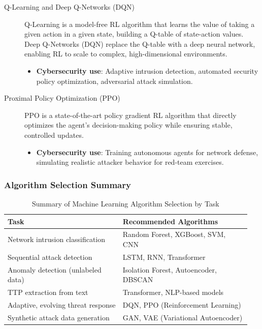 \begin{description}
    \item[Q-Learning and Deep Q-Networks (DQN)] Q-Learning is a model-free RL algorithm that learns the value of taking a given action in a given state, building a Q-table of state-action values. Deep Q-Networks (DQN) replace the Q-table with a deep neural network, enabling RL to scale to complex, high-dimensional environments.
    \begin{itemize}
        \item \textbf{Cybersecurity use}: Adaptive intrusion detection, automated security policy optimization, adversarial attack simulation.
    \end{itemize}

    \item[Proximal Policy Optimization (PPO)] PPO is a state-of-the-art policy gradient RL algorithm that directly optimizes the agent's decision-making policy while ensuring stable, controlled updates.
    \begin{itemize}
        \item \textbf{Cybersecurity use}: Training autonomous agents for network defense, simulating realistic attacker behavior for red-team exercises.
    \end{itemize}
\end{description}


\subsubsection*{Algorithm Selection Summary}

\begin{table}[H]
\centering
\begin{tabular}{|p{0.45\linewidth}|p{0.5\linewidth}|}
\hline
\textbf{Task} & \textbf{Recommended Algorithms} \\ \hline
Network intrusion classification & Random Forest, XGBoost, SVM, CNN \\ \hline
Sequential attack detection & LSTM, RNN, Transformer \\ \hline
Anomaly detection (unlabeled data) & Isolation Forest, Autoencoder, DBSCAN \\ \hline
TTP extraction from text & Transformer, NLP-based models \\ \hline
Adaptive, evolving threat response & DQN, PPO (Reinforcement Learning) \\ \hline
Synthetic attack data generation & GAN, VAE (Variational Autoencoder) \\ \hline
\end{tabular}
\caption{Summary of Machine Learning Algorithm Selection by Task}
\label{tab:alg_selection}
\end{table}


